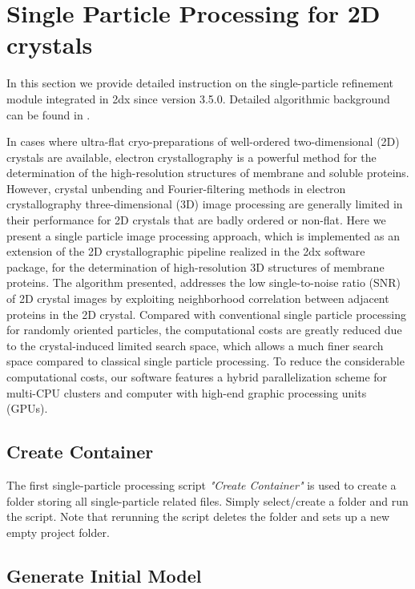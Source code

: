 \section{Single Particle Processing for 2D crystals}

In this section we provide detailed instruction on the single-particle refinement module integrated in 2dx since version 3.5.0. Detailed algorithmic background can be found in \cite{scherer2013single}.

In cases where ultra-flat cryo-preparations of well-ordered two-dimensional (2D) crystals are available, electron crystallography is a powerful method for the determination of the high-resolution structures of membrane and soluble proteins. However, crystal unbending and Fourier-filtering methods in electron crystallography three-dimensional (3D) image processing are generally limited in their performance for 2D crystals that are badly ordered or non-flat. Here we present a single particle image processing approach, which is implemented as an extension of the 2D crystallographic pipeline realized in the 2dx software package, for the determination of high-resolution 3D structures of membrane proteins. The algorithm presented, addresses the low single-to-noise ratio (SNR) of 2D crystal images by exploiting neighborhood correlation between adjacent proteins in the 2D crystal. Compared with conventional single particle processing for randomly oriented particles, the computational costs are greatly reduced due to the crystal-induced limited search space, which allows a much finer search space compared to classical single particle processing. To reduce the considerable computational costs, our software features a hybrid parallelization scheme for multi-CPU clusters and computer with high-end graphic processing units (GPUs).

\subsection{Create Container}
The first single-particle processing script \textit{"Create Container"} is used to create a folder storing all single-particle related files. Simply select/create a folder and run the script. Note that rerunning the script deletes the folder and sets up a new empty project folder.

\subsection{Generate Initial Model}

